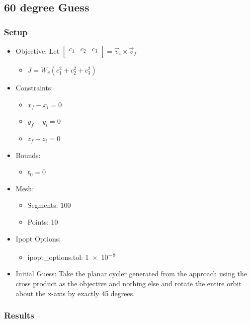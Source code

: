 \documentclass{article}
\begin{document}
\subsection{60 degree Guess}

\subsubsection{Setup}

\begin{itemize}
    \item Objective: Let $\left[\begin{matrix}c_1&c_2&c_3\\\end{matrix}\right] = \vec{v}_i\times\vec{v}_f$
    \begin{itemize}
        \item $J = W_v\left(c_1^2 + c_2^2 + c_3^2\right)$
    \end{itemize}
    \item Constraints: 
    \begin{itemize}
        \item $x_f - x_i = 0$
        \item $y_f - y_i = 0$
        \item $z_f - z_i = 0$
    \end{itemize}
    \item Bounds:
    \begin{itemize}
        \item $t_0 = 0$
    \end{itemize}
    \item Mesh:
    \begin{itemize}
        \item Segments: 100
        \item Points: 10
    \end{itemize}
    \item Ipopt Options:
    \begin{itemize}
        \item ipopt\_options.tol: \num{1e-8}
    \end{itemize}
    \item Initial Guess: Take the planar cycler generated from the approach using the cross product as the objective and nothing else and rotate the entire orbit about the x-axis by exactly 45 degrees.
\end{itemize}

\subsubsection{Results}
\end{document}
